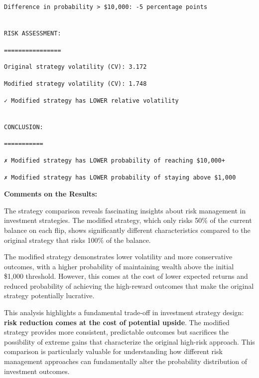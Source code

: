 \documentclass[
  letterpaper,
  DIV=11,
  numbers=noendperiod]{scrartcl}
\begin{document}
\begin{verbatim}
Difference in probability > $10,000: -5 percentage points
\end{verbatim}

\begin{verbatim}

RISK ASSESSMENT:
\end{verbatim}

\begin{verbatim}
================
\end{verbatim}

\begin{verbatim}
Original strategy volatility (CV): 3.172
\end{verbatim}

\begin{verbatim}
Modified strategy volatility (CV): 1.748
\end{verbatim}

\begin{verbatim}
✓ Modified strategy has LOWER relative volatility
\end{verbatim}

\begin{verbatim}

CONCLUSION:
\end{verbatim}

\begin{verbatim}
===========
\end{verbatim}

\begin{verbatim}
✗ Modified strategy has LOWER probability of reaching $10,000+
\end{verbatim}

\begin{verbatim}
✗ Modified strategy has LOWER probability of staying above $1,000
\end{verbatim}

\textbf{Comments on the Results:}

The strategy comparison reveals fascinating insights about risk
management in investment strategies. The modified strategy, which only
risks 50\% of the current balance on each flip, shows significantly
different characteristics compared to the original strategy that risks
100\% of the balance.

The modified strategy demonstrates lower volatility and more
conservative outcomes, with a higher probability of maintaining wealth
above the initial \$1,000 threshold. However, this comes at the cost of
lower expected returns and reduced probability of achieving the
high-reward outcomes that make the original strategy potentially
lucrative.

This analysis highlights a fundamental trade-off in investment strategy
design: \textbf{risk reduction comes at the cost of potential upside}.
The modified strategy provides more consistent, predictable outcomes but
sacrifices the possibility of extreme gains that characterize the
original high-risk approach. This comparison is particularly valuable
for understanding how different risk management approaches can
fundamentally alter the probability distribution of investment outcomes.
\end{document}
